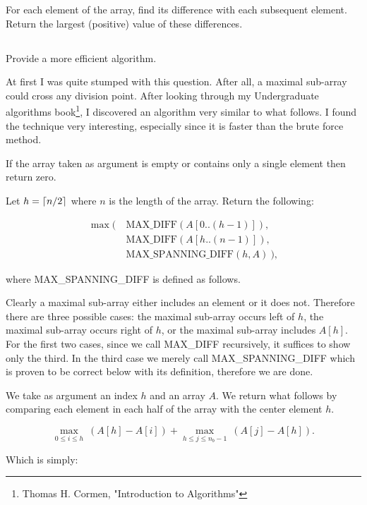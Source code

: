 \documentclass{amsart}
\theoremstyle{definition}
\theoremstyle{remark}
\numberwithin{equation}{section}
\DeclarePairedDelimiter{\ceil}{\lceil}{\rceil}
\begin{document}
For each element of the array, find its difference with each subsequent
element. Return the largest (positive) value of these differences.

\subsection{} Provide a more efficient algorithm.

At first I was quite stumped with this question. After all, a maximal
sub-array could cross any division point. After looking through my
Undergraduate algorithms book\footnote{Thomas H. Cormen, "Introduction
to Algorithms"}, I discovered an algorithm very similar to what follows.
I found the technique very interesting, especially since it is
faster than the brute force method.


If the array taken as argument is empty or contains only a single element then return zero.

Let $h = \ceil{n/2}$ where $n$ is the length of the array. Return the following:

\begin{align*}
  \max(\ & \text{MAX\_DIFF}( A[0..(h-1)] ), \\
        & \text{MAX\_DIFF}( A[h..(n-1)] ), \\
        & \text{MAX\_SPANNING\_DIFF}( h, A)\ ),
\end{align*}

where MAX\_SPANNING\_DIFF is defined as follows.

\proof 

Clearly a maximal sub-array either includes an element or it does not.
Therefore there are three possible cases: the maximal sub-array occurs
left of $h$, the maximal sub-array occurs right of $h$, or the maximal
sub-array includes $A[h]$. For the first two cases, since we call
MAX\_DIFF recursively, it suffices to show only the third. In the third
case we merely call MAX\_SPANNING\_DIFF which is proven to be correct
below with its definition, therefore we are done.


We take as argument an index $h$ and an array $A$. We return what
follows by comparing each element in each half of the array with the
center element $h$.

$$ \max_{0 \leq i \leq h}\ (A[h] - A[i]) + \max_{h \leq j \leq n_b -1}\ (A[j] - A[h]). $$

Which is simply:
\end{document}
